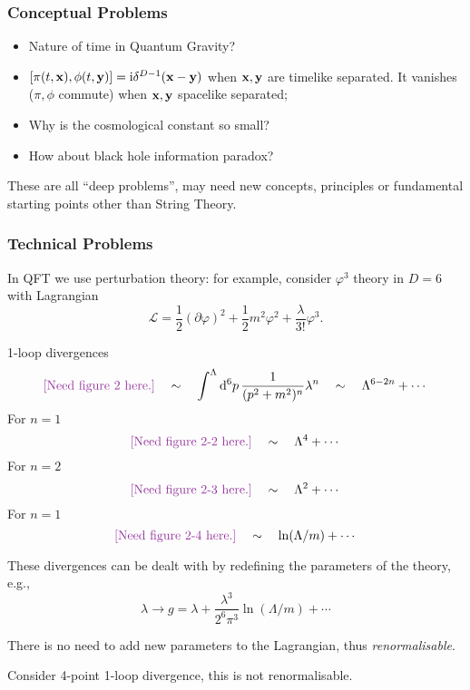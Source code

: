 \documentclass[a4paper,11pt]{article}
\begin{document}
	\subsubsection{Conceptual Problems}

	\begin{itemize}
		\item Nature of time in Quantum Gravity?
		\item $[\pi(t,\vb x), \phi(t,\vb y)] = \mathrm{i} \delta ^{D - 1}(\vb x - \vb y)$ when $\vb x, \vb y$ are timelike separated. It vanishes ($\pi, \phi$ commute) when $\vb x,\vb y$ spacelike separated; 
		\item Why is the cosmological constant so small?
		\item How about black hole information paradox?
	\end{itemize}
	These are all ``deep problems'', may need new concepts, principles or fundamental starting points other than String Theory.
	
	\subsubsection{Technical Problems}

	\begin{ex}[$\varphi^3$ in $D = 6$]
		In QFT we use perturbation theory: for example, consider $\varphi^3$ theory in $D = 6$ with Lagrangian
	\[
		\mathcal{L} = \frac{1}{2} (\partial \varphi)^2 + \frac{1}{2} m^2 \varphi^2 + \frac{\lambda}{3!} \varphi^3.
	\]
	
	1-loop divergences 
	\[
		\text{\needfig{2}} \quad \sim \quad \int^\Lambda \dd[6]{p} \frac{1}{(p^2 + m^2)^n} \lambda^n \quad \sim \quad \Lambda ^{6 - 2n} + \cdots
	\]
	For $n = 1$ 
	\[
		\text{\needfig{2-2}} \quad \sim \quad \Lambda^4 + \cdots
	\]
	For $n = 2$ 
	\[
		\text{\needfig{2-3}} \quad \sim \quad \Lambda^2 + \cdots
	\]
	For $n = 1$ 
	\[
		\text{\needfig{2-4}} \quad \sim \quad \ln (\Lambda / m) + \cdots
	\]

	These divergences can be dealt with by redefining the parameters of the theory, e.g., 
	\[
		\lambda \to g = \lambda + \frac{\lambda^3}{2^6 \pi^3}\ln (\Lambda / m) + \cdots 
	\]
	 
	There is no need to add new parameters to the Lagrangian, thus \emph{renormalisable}.
	\end{ex}

	\begin{ex}[$\varphi^3$ in $D = 8$]
		Consider 4-point 1-loop divergence, this is not renormalisable.
	\end{ex}
	
\end{document}
